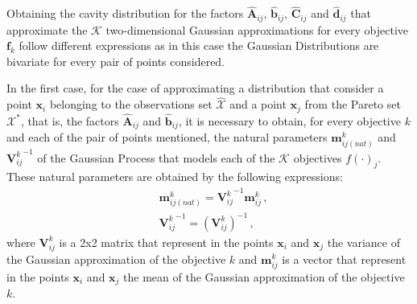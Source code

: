 Obtaining the cavity distribution for the factors $\hat{\boldsymbol{A}}_{ij}$, $\hat{\boldsymbol{b}}_{ij}$, $\hat{\boldsymbol{C}}_{ij}$ and $\hat{\boldsymbol{d}}_{ij}$ that approximate the $\mathcal{K}$ two-dimensional Gaussian approximations for every objective $\boldsymbol{f}_k$ follow different expressions as in this case the Gaussian Distributions are bivariate for every pair of points considered.

In the first case, for the case of approximating a distribution that consider a point $\boldsymbol{x}_i$ belonging to the observations set $\hat{\mathcal{X}}$ and a point $\boldsymbol{x}_j$ from the Pareto set $\mathcal{X}^*$, that is, the factors $\hat{\boldsymbol{A}}_{ij}$ and $\hat{\boldsymbol{b}}_{ij}$, it is necessary to obtain, for every objective $k$ and each of the pair of points mentioned, the natural parameters $\boldsymbol{m}_{ij(nat)}^{k}$ and ${\boldsymbol{V}_{ij}^{k}}^{-1}$ of the Gaussian Process that models each of the $\mathcal{K}$ objectives $f(\cdot)_j$.
These natural parameters are obtained by the following expressions:
\begin{align}
   & \boldsymbol{m}_{ij(nat)}^{k} = {\boldsymbol{V}_{ij}^{k}}^{-1}\boldsymbol{m}_{ij}^{k}\,, \nonumber \\
   & {\boldsymbol{V}_{ij}^{k}}^{-1} = (\boldsymbol{V}_{ij}^{k})^{-1}\,,
\end{align}
where $\boldsymbol{V}_{ij}^{k}$ is a 2x2 matrix that represent in the points $\boldsymbol{x}_i$ and $\boldsymbol{x}_j$ the variance of the Gaussian approximation of the objective $k$ and $\boldsymbol{m}_{ij}^{k}$ is a vector that represent in the points $\boldsymbol{x}_i$ and $\boldsymbol{x}_j$ the mean of the Gaussian approximation of the objective $k$.

